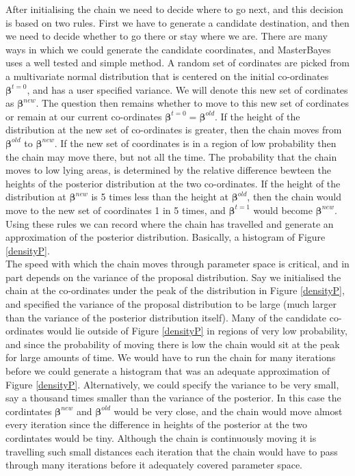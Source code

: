 \documentclass{article}
\begin{document}
After initialising the chain we need to decide where to go next, and this decision is based on two rules.  First we have to generate a candidate destination, and then we need to decide whether to go there or stay where we are.  There are many ways in which we could generate the candidate coordinates, and MasterBayes uses a well tested and simple method. A random set of cordinates are picked from a multivariate normal distribution that is centered on the initial co-ordinates  $\bm{\beta}^{t=0}$, and has a user specified variance.  We will denote this new set of cordinates as $\bm{\beta}^{new}$. The question then remains whether to move to this new set of cordinates or remain at our current co-ordinates $\bm{\beta}^{t=0} = \bm{\beta}^{old}$.  If the height of the distribution at the new set of co-ordinates is greater, then the chain moves from $\bm{\beta}^{old}$ to $\bm{\beta}^{new}$. If the new set of coordinates is in a region of low probability then the chain may move there, but not all the time.  The probability that the chain moves to low lying areas, is determined by the relative difference bewteen the heights of the posterior distribution at the two co-ordinates.  If the height of the distribution at $\bm{\beta}^{new}$ is 5 times less than the height at $\bm{\beta}^{old}$, then the chain would move to the new set of coordinates 1 in 5 times, and $\bm{\beta}^{t=1}$ would become $\bm{\beta}^{new}$.  Using these rules we can record where the chain has travelled and generate an approximation of the posterior distribution.  Basically, a histogram of Figure \ref{densityP}.\\

The speed with which the chain moves through parameter space is critical, and in part depends on the variance of the proposal distribution.  Say we initialised the chain at the co-ordinates under the peak of the distribution in Figure \ref{densityP}, and specified the variance of the proposal distribution to be large (much larger than the variance of the posterior distribution itself). Many of the candidate co-ordinates would lie outside of Figure \ref{densityP} in regions of very low probability, and since the probability of moving there is low the chain would sit at the peak for large amounts of time.  We would have to run the chain for many iterations before we could generate a histogram that was an adequate approximation of Figure \ref{densityP}.  Alternatively, we could specify the variance to be very small, say a thousand times smaller than the variance of the posterior.  In this case the cordintates $\bm{\beta}^{new}$ and $\bm{\beta}^{old}$ would be very close, and the chain would move almost every iteration since the difference in heights of the posterior at the two cordintates would be tiny.  Although the chain is continuously moving it is travelling such small distances each iteration that the chain would have to pass through many iterations before it adequately covered parameter space.\\  
\end{document}
